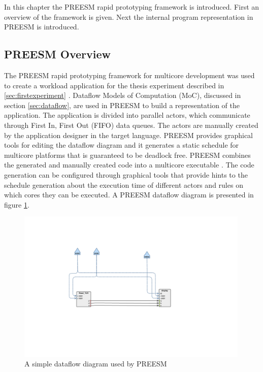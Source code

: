 In this chapter the PREESM rapid prototyping framework is introduced. First an overview of the framework is given. Next the internal program representation in PREESM is introduced. 

\subsection{PREESM Overview}
\label{sec:preesmover}
The PREESM rapid prototyping framework for multicore development was used to create a workload application for the thesis experiment described in \ref{sec:firstexperiment} . Dataflow Models of Computation (MoC), discussed in section \ref{sec:dataflow}, are used in PREESM to build a representation of the application. The application is divided into parallel actors, which communicate through First In, First Out (FIFO) data queues. The actors are manually created by the application designer in the target language. PREESM provides graphical tools for editing the dataflow diagram and it generates a static schedule for multicore platforms that is guaranteed to be deadlock free. PREESM combines the generated and manually created code into a multicore executable \cite{pelcat2014preesm}. The code generation can be configured through graphical tools that provide hints to the schedule generation about the execution time of different actors and rules on which cores they can be executed. A PREESM dataflow diagram is presented in figure \ref{fig:preesm_example}.

\begin{figure}[h!]
    \begin{center}
        \includegraphics[width=0.99\textwidth]{images/example_preesm_diagram.png}
        \caption{A simple dataflow diagram used by PREESM }
        \label{fig:preesm_example}
    \end{center}
\end{figure}

